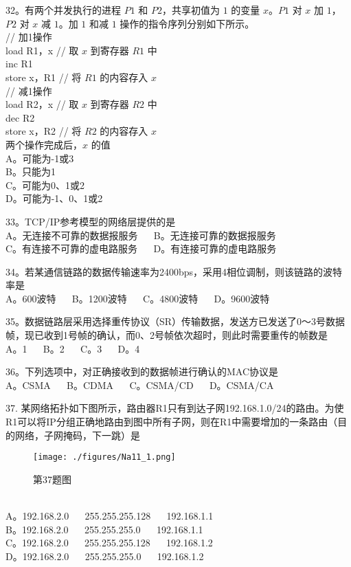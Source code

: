 32。有两个并发执行的进程 $P1$ 和 $P2$，共享初值为 $1$ 的变量 $x$。$P1$ 对 $x$ 加 $1$，$P2$ 对 $x$ 减 $1$。加 $1$ 和减 $1$ 操作的指令序列分别如下所示。 \\

// 加1操作 \\
load R1，x  // 取 $x$ 到寄存器 $R1$ 中 \\
inc R1 \\
store x，R1  // 将 $R1$ 的内容存入 $x$ \\

// 减1操作 \\
load R2，x // 取 $x$ 到寄存器 $R2$ 中 \\
dec R2 \\
store x，R2 // 将 $R2$ 的内容存入 $x$ \\

两个操作完成后，$x$ 的值 \\
A。可能为-1或3 \\
B。只能为1 \\
C。可能为0、1或2 \\
D。可能为-1、0、1或2

33。TCP/IP参考模型的网络层提供的是 \\
A。无连接不可靠的数据报服务 $\quad$ B。无连接可靠的数据报服务 \\
C。有连接不可靠的虚电路服务 $\quad$ D。有连接可靠的虚电路服务

34。若某通信链路的数据传输速率为2400bps，采用4相位调制，则该链路的波特率是 \\
A。600波特 $\quad$ B。1200波特 $\quad$ C。4800波特 $\quad$ D。9600波特

35。数据链路层采用选择重传协议（SR）传输数据，发送方已发送了0～3号数据帧，现已收到1号帧的确认，而0、2号帧依次超时，则此时需要重传的帧数是 \\
A。1 $\quad$ B。2 $\quad$ C。3 $\quad$ D。4

36。下列选项中，对正确接收到的数据帧进行确认的MAC协议是 \\
A。CSMA $\quad$ B。CDMA $\quad$ C。CSMA/CD $\quad$ D。CSMA/CA

37. 某网络拓扑如下图所示，路由器R1只有到达子网192.168.1.0/24的路由。为使R1可以将IP分组正确地路由到图中所有子网，则在R1中需要增加的一条路由（目的网络，子网掩码，下一跳）是 \\
\begin{figure}[ht]
\centering
\texttt{[image: ./figures/Na11\_1.png]}
\caption{第37题图} \label{Na11_fig1}
\end{figure}
\\
A。192.168.2.0 $\quad$ 255.255.255.128 $\quad$ 192.168.1.1 \\
B。192.168.2.0 $\quad$ 255.255.255.0 $\quad$ 192.168.1.1 \\
C。192.168.2.0 $\quad$ 255.255.255.128 $\quad$ 192.168.1.2 \\
D。192.168.2.0 $\quad$ 255.255.255.0 $\quad$ 192.168.1.2 \\

